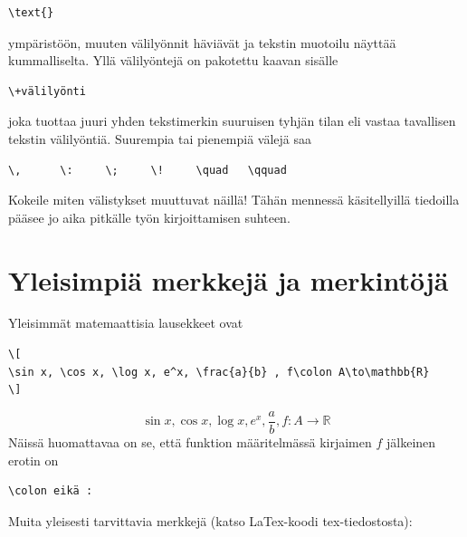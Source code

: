 \documentclass[a4paper,12 pt]{article}
\theoremstyle{plain}
\theoremstyle{definition}
\theoremstyle{remark}
\numberwithin{equation}{section}
\numberwithin{figure}{section}
\begin{document}
\begin{verbatim}
\text{}   
\end{verbatim}
ympäristöön, muuten välilyönnit häviävät ja tekstin muotoilu näyttää kummalliselta. Yllä välilyöntejä on pakotettu kaavan sisälle 

\begin{verbatim}
\+välilyönti
\end{verbatim}
joka tuottaa juuri yhden tekstimerkin suuruisen tyhjän tilan eli vastaa tavallisen tekstin välilyöntiä. Suurempia tai pienempiä välejä saa 

\begin{verbatim}
\,      \:     \;     \!     \quad   \qquad
\end{verbatim}
Kokeile miten välistykset muuttuvat näillä! Tähän mennessä käsitellyillä tiedoilla pääsee jo aika pitkälle työn kirjoittamisen suhteen. 

\section{Yleisimpiä merkkejä ja merkintöjä}

Yleisimmät matemaattisia lausekkeet ovat

\begin{verbatim}
\[
\sin x, \cos x, \log x, e^x, \frac{a}{b} , f\colon A\to\mathbb{R}
\]  
\end{verbatim}

\[ 
\sin x, \cos x, \log x, e^x, \frac{a}{b}, f\colon A\to\mathbb{R}
\]
Näissä huomattavaa on se, että funktion määritelmässä kirjaimen $f$ jälkeinen erotin on

\begin{verbatim}
\colon eikä :
\end{verbatim}

Muita yleisesti tarvittavia merkkejä (katso LaTex-koodi tex-tiedostosta):
\end{document}

